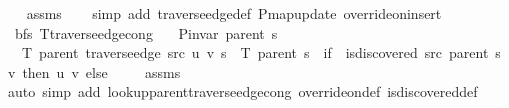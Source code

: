 \begin{isabellebody}
%
\isadelimproof
\ \ %
\endisadelimproof
%
\isatagproof
{}\isamarkupfalse%
\ assms\isanewline
\ \ \isamarkupfalse%
\ {\isacharparenleft}{\kern0pt}simp\ add{\isacharcolon}{\kern0pt}\ traverse{\isacharunderscore}{\kern0pt}edge{\isacharunderscore}{\kern0pt}def\ P{\isachardot}{\kern0pt}map{\isacharunderscore}{\kern0pt}update\ override{\isacharunderscore}{\kern0pt}on{\isacharunderscore}{\kern0pt}insert{\isacharprime}{\kern0pt}{\isacharparenright}{\kern0pt}%
\endisatagproof
{\isafoldproof}%
%
\isadelimproof
\isanewline
%
\endisadelimproof
\isanewline
{}\isamarkupfalse%
\ {\isacharparenleft}{\kern0pt}\ bfs{\isacharparenright}{\kern0pt}\ T{\isacharunderscore}{\kern0pt}traverse{\isacharunderscore}{\kern0pt}edge{\isacharunderscore}{\kern0pt}cong{\isacharcolon}{\kern0pt}\isanewline
\ \ \ {\isachardoublequoteopen}P{\isacharunderscore}{\kern0pt}invar\ {\isacharparenleft}{\kern0pt}parent\ s{\isacharparenright}{\kern0pt}{\isachardoublequoteclose}\isanewline
\ \ \ {\isachardoublequoteopen}T\ {\isacharparenleft}{\kern0pt}parent\ {\isacharparenleft}{\kern0pt}traverse{\isacharunderscore}{\kern0pt}edge\ src\ u\ v\ s{\isacharparenright}{\kern0pt}{\isacharparenright}{\kern0pt}\ {\isacharequal}{\kern0pt}\ T\ {\isacharparenleft}{\kern0pt}parent\ s{\isacharparenright}{\kern0pt}\ {\isasymunion}\ {\isacharparenleft}{\kern0pt}if\ {\isasymnot}\ is{\isacharunderscore}{\kern0pt}discovered\ src\ {\isacharparenleft}{\kern0pt}parent\ s{\isacharparenright}{\kern0pt}\ v\ then\ {\isacharbraceleft}{\kern0pt}{\isacharparenleft}{\kern0pt}u{\isacharcomma}{\kern0pt}\ v{\isacharparenright}{\kern0pt}{\isacharbraceright}{\kern0pt}\ else\ {\isacharbraceleft}{\kern0pt}{\isacharbraceright}{\kern0pt}{\isacharparenright}{\kern0pt}{\isachardoublequoteclose}\isanewline
%
\isadelimproof
\ \ %
\endisadelimproof
%
\isatagproof
{}\isamarkupfalse%
\ assms\isanewline
\ \ \isamarkupfalse%
\ {\isacharparenleft}{\kern0pt}auto\ simp\ add{\isacharcolon}{\kern0pt}\ lookup{\isacharunderscore}{\kern0pt}parent{\isacharunderscore}{\kern0pt}traverse{\isacharunderscore}{\kern0pt}edge{\isacharunderscore}{\kern0pt}cong\ override{\isacharunderscore}{\kern0pt}on{\isacharunderscore}{\kern0pt}def\ is{\isacharunderscore}{\kern0pt}discovered{\isacharunderscore}{\kern0pt}def{\isacharparenright}{\kern0pt}%
\endisatagproof
{\isafoldproof}%
%
\isadelimproof
%
\endisadelimproof
%
\begin{isamarkuptext}%

\end{isamarkuptext}
\end{isabellebody}
